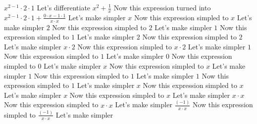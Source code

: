 \documentclass[14pt]{article}
\begin{document}
$x^{2-1}\cdot 2\cdot 1$
\newline
Let's differentiate 
$x^{2}+\frac {1}{x}$
\newline
Now this expression turned into 
$x^{2-1}\cdot 2\cdot 1+\frac {0\cdot x-1\cdot 1}{x\cdot x}$
\newline
Let's make simpler 
$x$
\newline
Now this expression simpled to 
$x$
\newline
Let's make simpler 
$2$
\newline
Now this expression simpled to 
$2$
\newline
Let's make simpler 
$1$
\newline
Now this expression simpled to 
$1$
\newline
Let's make simpler 
$2$
\newline
Now this expression simpled to 
$2$
\newline
Let's make simpler 
$x\cdot 2$
\newline
Now this expression simpled to 
$x\cdot 2$
\newline
Let's make simpler 
$1$
\newline
Now this expression simpled to 
$1$
\newline
Let's make simpler 
$0$
\newline
Now this expression simpled to 
$0$
\newline
Let's make simpler 
$x$
\newline
Now this expression simpled to 
$x$
\newline
Let's make simpler 
$1$
\newline
Now this expression simpled to 
$1$
\newline
Let's make simpler 
$1$
\newline
Now this expression simpled to 
$1$
\newline
Let's make simpler 
$x$
\newline
Now this expression simpled to 
$x$
\newline
Let's make simpler 
$x$
\newline
Now this expression simpled to 
$x$
\newline
Let's make simpler 
$x\cdot x$
\newline
Now this expression simpled to 
$x\cdot x$
\newline
Let's make simpler 
$\frac {(-1)}{x\cdot x}$
\newline
Now this expression simpled to 
$\frac {(-1)}{x\cdot x}$
\newline
Let's make simpler 
\end{document}
